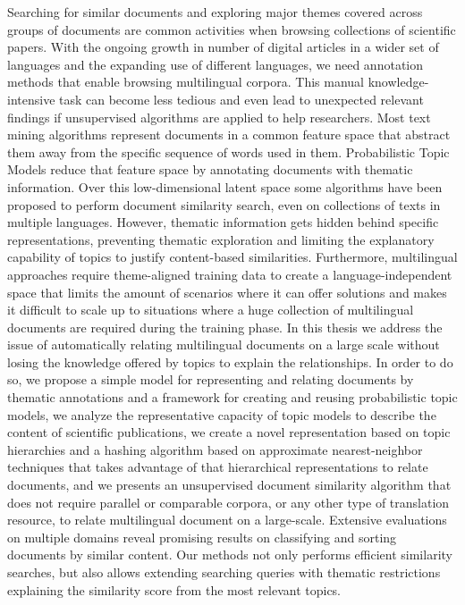 


\begin{abstractslong}  
Searching for similar documents and exploring major themes covered across groups of documents are common activities when browsing collections of scientific papers. With the ongoing growth in number of digital articles in a wider set of languages and the expanding use of different languages, we need annotation methods that enable browsing multilingual corpora. This manual knowledge-intensive task can become less tedious and even lead to unexpected relevant findings if unsupervised algorithms are applied to help researchers. Most text mining algorithms represent documents in a common feature space that abstract them away from the specific sequence of words used in them. Probabilistic Topic Models reduce that feature space by annotating documents with thematic information. Over this low-dimensional latent space some algorithms have been proposed to perform document similarity search, even on collections of texts in multiple languages. However, thematic information gets hidden behind specific representations, preventing thematic exploration and limiting the explanatory capability of topics to justify content-based similarities. Furthermore, multilingual approaches require theme-aligned training data to create a language-independent space that limits the amount of scenarios where it can offer solutions and makes it difficult to scale up to situations where a huge collection of multilingual documents are required during the training phase. In this thesis we address the issue of automatically relating multilingual documents on a large scale without losing the knowledge offered by topics to explain the relationships. In order to do so, we propose a simple model for representing and relating documents by thematic annotations and a framework for creating and reusing probabilistic topic models, we analyze the representative capacity of topic models to describe the content of scientific publications, we create a novel representation based on topic hierarchies and a hashing algorithm based on approximate nearest-neighbor techniques that takes advantage of that hierarchical representations to relate documents, and we presents an unsupervised document similarity algorithm that does not require parallel or comparable corpora, or any other type of translation resource, to relate multilingual document on a large-scale. Extensive evaluations on multiple domains reveal promising results on classifying and sorting documents by similar content. Our methods not only performs efficient similarity searches, but also allows extending searching queries with thematic restrictions explaining the similarity score from the most relevant topics. 


\end{abstractslong}

